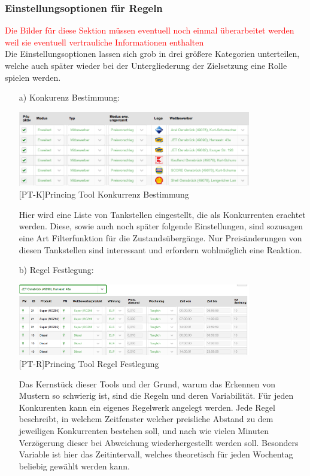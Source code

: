 \documentclass[12pt,a4paper,bibliography=totocnumbered,listof=totocnumbered]{scrartcl}
\begin{document}
\subsubsection{Einstellungsoptionen für Regeln}
\textcolor{red}{Die Bilder für diese Sektion müssen eventuell noch einmal überarbeitet werden weil sie eventuell vertrauliche Informationen enthalten}\\
Die Einstellungsoptionen lassen sich grob in drei größere Kategorien unterteilen, welche auch später wieder bei der Untergliederung der Zielsetzung eine Rolle spielen werden.
\begin{enumerate}
\item[a)] Konkurenz Bestimmung:\\ 

\begin{center}
	\includegraphics[width=0.8\textwidth, draft]{Bilder/konkurenz.png}\\
	[PT-K]{Princing Tool Konkurrenz Bestimmung}
	\label{fig:PT-K}
\end{center}
Hier wird eine Liste von Tankstellen eingestellt, die als Konkurrenten erachtet werden. Diese, sowie auch noch später folgende Einstellungen, sind sozusagen eine Art Filterfunktion für die Zustandsübergänge. Nur Preisänderungen von diesen Tankstellen sind interessant und erfordern wohlmöglich eine Reaktion.

\item[b)] Regel Festlegung:\\
\begin{center}
	\includegraphics[width=0.8\textwidth, draft]{Bilder/regeln2.png}\\
	[PT-R]{Princing Tool Regel Festlegung}
	\label{fig:PT-R}
\end{center}
Das Kernstück dieser Tools und der Grund, warum das Erkennen von Mustern so schwierig ist, sind die Regeln und deren Variabilität. Für jeden Konkurenten kann ein eigenes Regelwerk angelegt werden. Jede Regel beschreibt, in welchem Zeitfenster welcher preisliche Abstand zu dem jeweiligen Konkurrenten bestehen soll, und nach wie vielen Minuten Verzögerung dieser bei Abweichung wiederhergestellt werden soll. Besonders Variable ist hier das Zeitintervall, welches theoretisch für jeden Wochentag beliebig gewählt werden kann.


\end{enumerate}
\end{document}
